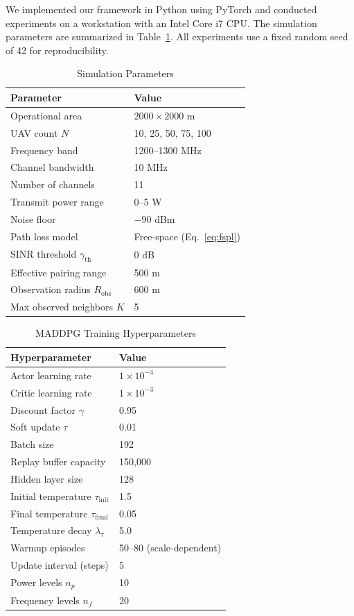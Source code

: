 \documentclass[conference]{IEEEtran}
\begin{document}
We implemented our framework in Python using PyTorch and conducted experiments on a workstation with an Intel Core i7 CPU. The simulation parameters are summarized in Table~\ref{tab:params}. All experiments use a fixed random seed of 42 for reproducibility.

\begin{table}[t]
\caption{Simulation Parameters}
\label{tab:params}
\centering
\begin{tabular}{@{}ll@{}}
\toprule
\textbf{Parameter} & \textbf{Value} \\
\midrule
Operational area & $2000 \times 2000$ m \\
UAV count $N$ & 10, 25, 50, 75, 100 \\
Frequency band & 1200--1300 MHz \\
Channel bandwidth & 10 MHz \\
Number of channels & 11 \\
Transmit power range & 0--5 W \\
Noise floor & $-90$ dBm \\
Path loss model & Free-space (Eq.~\ref{eq:fspl}) \\
SINR threshold $\gamma_{\text{th}}$ & 0 dB \\
Effective pairing range & 500 m \\
Observation radius $R_{\text{obs}}$ & 600 m \\
Max observed neighbors $K$ & 5 \\
\bottomrule
\end{tabular}
\end{table}

\begin{table}[t]
\caption{MADDPG Training Hyperparameters}
\label{tab:hparams}
\centering
\begin{tabular}{@{}ll@{}}
\toprule
\textbf{Hyperparameter} & \textbf{Value} \\
\midrule
Actor learning rate & $1 \times 10^{-4}$ \\
Critic learning rate & $1 \times 10^{-3}$ \\
Discount factor $\gamma$ & 0.95 \\
Soft update $\tau$ & 0.01 \\
Batch size & 192 \\
Replay buffer capacity & 150,000 \\
Hidden layer size & 128 \\
Initial temperature $\tau_{\text{init}}$ & 1.5 \\
Final temperature $\tau_{\text{final}}$ & 0.05 \\
Temperature decay $\lambda_\tau$ & 5.0 \\
Warmup episodes & 50--80 (scale-dependent) \\
Update interval (steps) & 5 \\
Power levels $n_p$ & 10 \\
Frequency levels $n_f$ & 20 \\
\bottomrule
\end{tabular}
\end{table}
\end{document}
